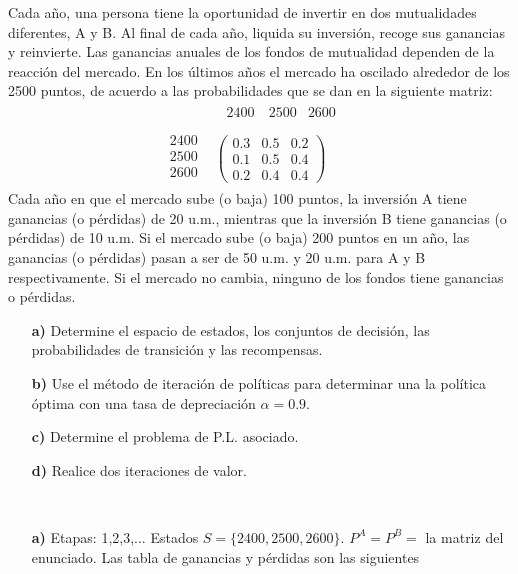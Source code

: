 \documentclass[twoside]{article}
\begin{document}
\begin{ejercicio}{3}

Cada año, una persona tiene la oportunidad de invertir en dos mutualidades diferentes, A y B.
Al final de cada año, liquida su inversión, recoge sus ganancias y reinvierte. Las ganancias anuales
de los fondos de mutualidad dependen de la reacción del mercado. En los últimos años el mercado
ha oscilado alrededor de los 2500 puntos, de acuerdo a las probabilidades que se dan en la siguiente
matriz:
\[
\begin{array}{cc}
  \begin{matrix}
 
\end{matrix} & \begin{matrix}
~~2400 & ~2500 & 2600~  & \\ 
\end{matrix} \\
\begin{matrix}
2400 \\
2500 \\
2600 \\
\end{matrix}
 & \begin{pmatrix}
0.3 & 0.5 & 0.2 \\
0.1 & 0.5 & 0.4 \\
0.2 & 0.4 & 0.4
\end{pmatrix}
\end{array}
\]
Cada año en que el mercado sube (o baja) 100 puntos, la inversión A tiene ganancias (o pérdidas)
de 20 u.m., mientras que la inversión B tiene ganancias (o pérdidas) de 10 u.m. Si el mercado sube
(o baja) 200 puntos en un año, las ganancias (o pérdidas) pasan a ser de 50 u.m. y 20 u.m. para A
y B respectivamente. Si el mercado no cambia, ninguno de los fondos tiene ganancias o pérdidas.
\begin{itemize}
\item[\textbf{a)}] Determine el espacio de estados, los conjuntos de decisión, las probabilidades de transición y
las recompensas.
\item[\textbf{b)}] Use el método de iteración de políticas para determinar una la política óptima con una tasa de
depreciación $\alpha = 0.9$.
\item[\textbf{c)}] Determine el problema de P.L. asociado.
\item[\textbf{d)}] Realice dos iteraciones de valor.
\end{itemize}

\begin{solucion}\
\begin{itemize}
\item[\textbf{a)}] Etapas: 1,2,3,... Estados $S=\{2400,2500,2600\}$. $P^A=P^B=$ la matriz del enunciado. Las tabla de ganancias y pérdidas son las siguientes


\end{itemize}
\end{solucion}
\end{ejercicio}
\end{document}
